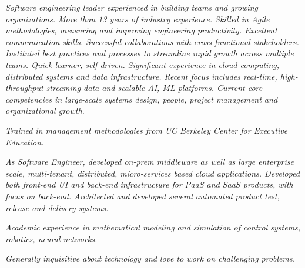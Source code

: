 {\selectfont
	\begin{justify}\textit{Software engineering leader experienced in building teams and growing organizations. More than 13 years of industry experience. Skilled in Agile methodologies, measuring and improving engineering productivity. Excellent communication skills. Successful collaborations with cross-functional stakeholders. Instituted best practices and processes to streamline rapid growth across multiple teams. Quick learner, self-driven. Significant experience in cloud computing, distributed systems and data infrastructure. Recent focus includes real-time, high-throughput streaming data and scalable AI, ML platforms. Current core competencies in large-scale systems design, people, project management and organizational growth.}\end{justify}
	
	\begin{justify}\textit{Trained in management methodologies from UC Berkeley Center for Executive Education.}\end{justify}
	
	\begin{justify}\textit{As Software Engineer, developed on-prem middleware as well as large enterprise scale, multi-tenant, distributed, micro-services based cloud applications. Developed both front-end UI and back-end infrastructure for PaaS and SaaS products, with focus on back-end. Architected and developed several automated product test, release and delivery systems.}\end{justify}

	\begin{justify}\textit{Academic experience in mathematical modeling and simulation of control systems, robotics, neural networks.}\end{justify}

	\begin{justify}\textit{Generally inquisitive about technology and love to work on challenging problems.}\end{justify}
}
\vspace{-12pt}